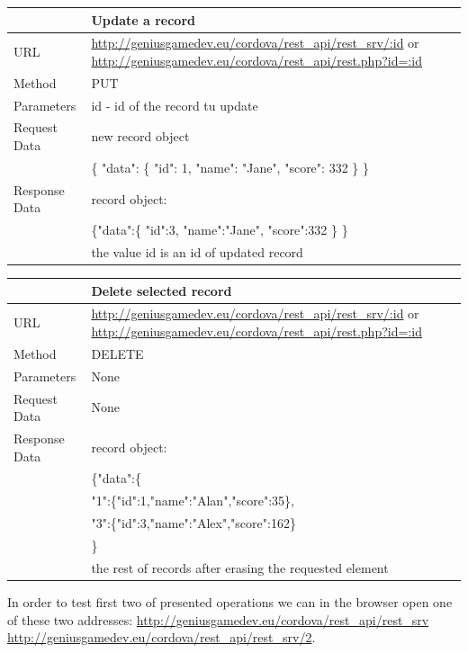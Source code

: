 \begin{tabularx}{\textwidth}{|l|X|}
\hline
&\textbf{Update a record}\\\hline
URL &   \url{http://geniusgamedev.eu/cordova/rest_api/rest_srv/:id} or \url{http://geniusgamedev.eu/cordova/rest_api/rest.php?id=:id}\\\hline
Method  & PUT\\\hline
Parameters  & id - id of the record tu update \\\hline
Request Data & new record object\\
&\{
"data": \{
"id": 1,
"name": "Jane",
"score": 332
\}
\}
\\\hline
Response Data & record object:\\
&
\{"data":\{
    "id":3,
    "name":"Jane",
    "score":332
    \}
\}
\\
&the value id is an id of updated record
\\\hline
\end{tabularx}

\begin{tabularx}{\textwidth}{|l|X|}
\hline
&\textbf{Delete selected record}\\\hline
URL &   \url{http://geniusgamedev.eu/cordova/rest_api/rest_srv/:id} or \url{http://geniusgamedev.eu/cordova/rest_api/rest.php?id=:id}\\\hline
Method  & DELETE\\\hline
Parameters  & None \\\hline
Request Data & None\\\hline
Response Data & record object:\\
&
\{"data":\{\\
&"1":\{"id":1,"name":"Alan","score":35\},\\
&"3":\{"id":3,"name":"Alex","score":162\}\\
&\}
\\
&the rest of records after erasing the requested element
\\\hline
\end{tabularx}


In order to test first two of presented operations we can in the browser open one of these two addresses: \url{http://geniusgamedev.eu/cordova/rest_api/rest_srv} \url{http://geniusgamedev.eu/cordova/rest_api/rest_srv/2}.

